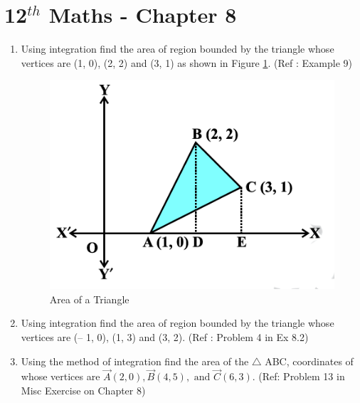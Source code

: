 \documentclass[12pt]{article}
\newcommand{\vertex}[3]{
    \vec{#1}({#2}, {#3})
}
\begin{document}
\section{12$^{th}$ Maths - Chapter 8}
\begin{enumerate}
\item Using integration find the area of region bounded by the triangle whose
vertices are (1, 0), (2, 2) and (3, 1) as shown in Figure \ref{fig:Fig1}. (Ref : Example 9)

\begin{figure}[!h]
	\includegraphics[width=\columnwidth]{./fig1}
\caption{Area of a Triangle}
\label{fig:Fig1}
\end{figure}

\item Using integration find the area of region bounded by the triangle whose vertices
are (– 1, 0), (1, 3) and (3, 2). (Ref : Problem 4 in Ex 8.2)

\item Using the method of integration find the area of the $\triangle$ ABC, coordinates of whose vertices are $\vertex{A}{2}{0}, \vertex{B}{4}{5}, \text{ and } \vertex{C}{6}{3}$. (Ref: Problem 13 in Misc Exercise on Chapter 8)

\end{enumerate}
\end{document}
